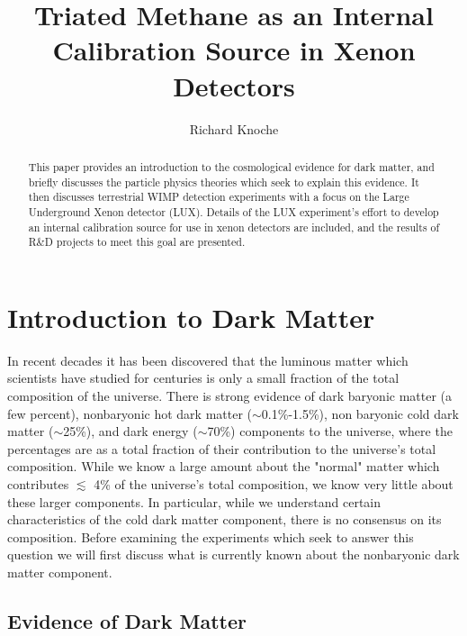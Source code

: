 \documentclass[a4paper,12pt]{article}
\begin{document}
\title{Triated Methane as an Internal Calibration Source in Xenon Detectors}
\author{Richard Knoche}
\maketitle

\begin{abstract}
This paper provides an introduction to the cosmological evidence for dark matter, and briefly discusses the particle physics theories which seek to explain this evidence.  It then discusses terrestrial WIMP detection experiments with a focus on the Large Underground Xenon detector (LUX).  Details of the LUX experiment's effort to develop an internal calibration source for use in xenon detectors are included, and the results of R\&D projects to meet this goal are presented.

\end{abstract}

\tableofcontents



\section{Introduction to Dark Matter}

In recent decades it has been discovered that the luminous matter which scientists have studied for centuries is only a small fraction of the total composition of the universe.  There is strong evidence of dark baryonic matter (a few percent), nonbaryonic hot dark matter ($\sim$0.1\%-1.5\%), non baryonic cold dark matter ($\sim$25\%), and dark energy ($\sim$70\%) components to the universe, where the percentages are as a total fraction of their contribution to the universe's total composition.  While we know a large amount about the "normal" matter which contributes $ \lesssim $ 4\% of the universe's total composition, we know very little about these larger components.  In particular, while we understand certain characteristics of the cold dark matter component, there is no consensus on its composition.  Before examining the experiments which seek to answer this question we will first discuss what is currently known about the nonbaryonic dark matter component.

\subsection{Evidence of Dark Matter}
\end{document}
